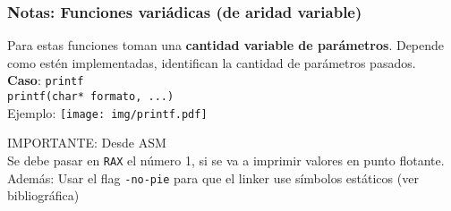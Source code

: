 \documentclass[aspectratio=169]{beamer}
\begin{document}
\begin{frame}[fragile]
    \frametitle{Notas: Funciones variádicas (de aridad variable)}
    \pause
    Para estas funciones toman una \textbf{cantidad variable de parámetros}.
    Depende como estén implementadas, identifican la cantidad de parámetros pasados.\\
    \pause
    \bigskip
    \textbf{Caso}: \texttt{printf}\\
    \bigskip
    \texttt{printf(char* formato, ...)}\\
    \pause
    \bigskip
    \textcolor{verdeuca}{Ejemplo}:
    \bigskip
    \texttt{[image: img/printf.pdf]}

    \pause
    \textcolor{verdeuca}{IMPORTANTE: Desde ASM}\\
    Se debe pasar en \texttt{RAX} el número 1, si se va a imprimir valores en punto flotante.\\
    \small \textcolor{verdeuca}{Además:} Usar el flag \texttt{-no-pie} para que el linker use símbolos estáticos (ver bibliográfica)
\end{frame}
\end{document}
